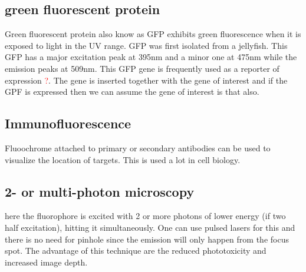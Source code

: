 	\subsection{green fluorescent protein}
	Green fluorescent protein also know as GFP exhibits green fluorescence when it is exposed to light in the UV range. GFP was first isolated from a jellyfish. This GFP has a major excitation peak at 395nm and a minor one at 475nm while the emission peaks at 509nm. This GFP gene is frequently used as a reporter of expression \textcolor{red}{?}. The gene is inserted together with the gene of interest and if the GPF is expressed then we can assume the  gene of interest is that also.

	\subsection{Immunofluorescence}
	Fluoochrome attached to primary or secondary antibodies can be used to visualize the location of targets. This is used a lot in cell biology. 

	\subsection{2- or multi-photon microscopy}
	here the fluorophore is excited with 2 or more photons of lower energy (if two half excitation), hitting it simultaneously. One can use pulsed lasers for this and there is no need for pinhole since the emission will only happen from the focus spot. The advantage of this technique are the reduced phototoxicity and increased image depth. 
	 




